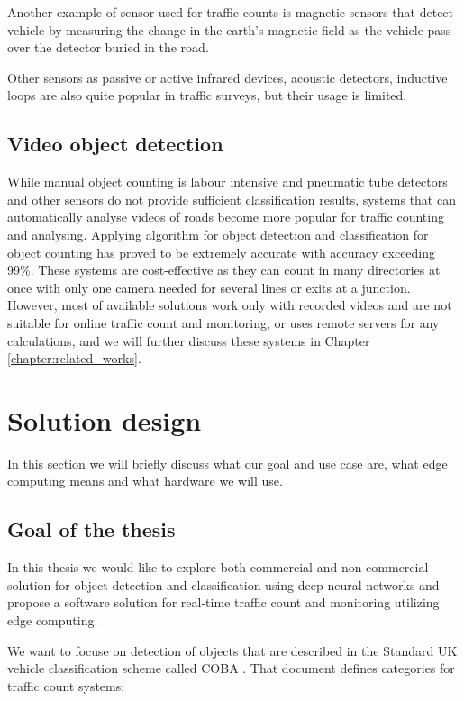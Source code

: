 \documentclass[twoside]{ctuthesis}
\theoremstyle{plain}
\theoremstyle{definition}
\theoremstyle{note}
\begin{document}
 Another example of sensor used for traffic counts is magnetic sensors that detect vehicle by measuring the change in the earth's magnetic field as the vehicle pass over the detector buried in the road\cite{windmillsoftware2018}.
 
 Other sensors as passive or active infrared devices, acoustic detectors, inductive loops are also quite popular in traffic surveys, but their usage is limited.
 
\subsection{Video object detection}
While manual object counting is labour intensive and pneumatic tube detectors and other sensors do not provide sufficient classification results, systems that can automatically analyse videos of roads become more popular for traffic counting and analysing. Applying algorithm for object detection and classification for object counting has proved to be extremely accurate with accuracy exceeding 99\%\cite{liu_zeng_jiang_2017}.
These systems are cost-effective as they can count in many directories at once with only one camera needed for several lines or exits at a junction.  However, most of available solutions work only with recorded videos and are not suitable for online traffic count and monitoring, or uses remote servers for any calculations, and we will further discuss these systems in Chapter \ref{chapter:related_works}.


\section{Solution design}

In this section we will briefly discuss what our goal and use case are, what edge computing means and what hardware we will use.

\subsection{Goal of the thesis}
In this thesis we would like to explore both commercial and non-commercial solution for object detection and classification using deep neural networks and propose a software solution for real-time traffic count and monitoring utilizing edge computing. 

We want to focuse on detection of objects that are described in the Standard UK vehicle classification scheme called COBA \cite{vehicle_scheme}\cite{coba_manual}. That document defines categories for traffic count systems:
\end{document}
